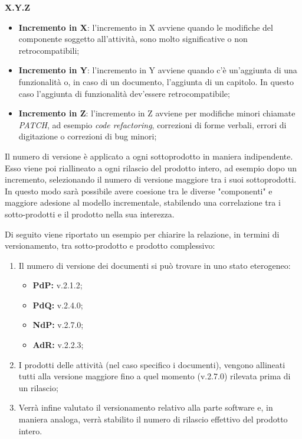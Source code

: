 \centerline{\textbf{X.Y.Z}}

\begin{itemize}
  \item \textbf{Incremento in X}: l'incremento in X avviene quando le modifiche del componente soggetto all'attività, sono molto significative o non retrocompatibili;
  \item \textbf{Incremento in Y}: l'incremento in Y avviene quando c'è un'aggiunta di una funzionalità o, in caso di un documento, l'aggiunta di un capitolo.
	In questo caso l'aggiunta di funzionalità dev'essere retrocompatibile;
  \item \textbf{Incremento in Z}: l'incremento in Z avviene per modifiche minori chiamate \textit{PATCH\glo}, ad esempio \textit{code refactoring\glos},
	correzioni di forme verbali, errori di digitazione o correzioni di bug minori;

\end{itemize}
 \noindent Il numero di versione è applicato a ogni sottoprodotto in maniera indipendente.
 Esso viene poi riallineato a ogni rilascio del prodotto intero, ad esempio dopo un incremento, selezionando il numero di versione maggiore tra i suoi sottoprodotti.
 In questo modo sarà possibile avere coesione tra le diverse "componenti" e maggiore adesione al modello incrementale, stabilendo una correlazione tra i sotto-prodotti e il prodotto nella sua interezza.


\noindent Di seguito viene riportato un esempio per chiarire la relazione, in termini di versionamento, tra sotto-prodotto e prodotto complessivo:
\begin{enumerate}
	\item Il numero di versione dei documenti si può trovare in uno stato eterogeneo:
	\begin{itemize}
		\item \textbf{PdP:} v.2.1.2;
		\item \textbf{PdQ:} v.2.4.0;
		\item \textbf{NdP:} v.2.7.0;
		\item\textbf{AdR:} v.2.2.3;
	\end{itemize}
	\item I prodotti delle attività (nel caso specifico i documenti), vengono allineati tutti alla versione maggiore fino a quel momento (v.2.7.0) rilevata prima di un rilascio;
	\item Verrà infine valutato il versionamento relativo alla parte software e, in maniera analoga, verrà stabilito il numero di rilascio effettivo del prodotto intero.
\end{enumerate}





